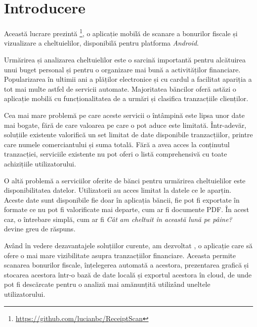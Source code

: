 \chapter{Introducere}\label{introducere}
\setcounter{page}{1}

Această lucrare prezintă \AppNameB \footnote{\href{https://github.com/lucianbc/ReceiptScan}{https://github.com/lucianbc/ReceiptScan}}, o aplicație mobilă de scanare a bonurilor fiscale și vizualizare a cheltuielilor, disponibilă pentru platforma \emph{Android}.


Urmărirea și analizarea cheltuielilor este o sarcină importantă pentru alcătuirea unui buget personal și pentru o organizare mai bună a activităților financiare. Popularizarea în ultimii ani a plăților electronice și cu cardul a facilitat apariția a tot mai multe astfel de servicii automate. Majoritatea băncilor oferă astăzi o aplicație mobilă cu funcționalitatea de a urmări și clasifica tranzacțiile clienților.

Cea mai mare problemă pe care aceste servicii o întâmpină este lipsa unor date mai bogate, fără de care valoarea pe care o pot aduce este limitată. Într-adevăr, soluțiile existente valorifică un set limitat de date disponibile tranzacțiilor, printre care numele comerciantului și suma totală. Fără a avea acces la conținutul tranzacției, serviciile existente nu pot oferi o listă comprehensivă cu toate achizițiile utilizatorului.

O altă problemă a serviciilor oferite de bănci pentru urmărirea cheltuielilor este disponibilitatea datelor. Utilizatorii au acces limitat la datele ce le aparțin. Aceste date sunt disponibile fie doar în aplicația băncii, fie pot fi exportate în formate ce nu pot fi valorificate mai departe, cum ar fi documente PDF. În acest caz, o întrebare simplă, cum ar fi \textit{Cât am cheltuit în această lună pe pâine?} devine greu de răspuns.

Având în vedere dezavantajele soluțiilor curente, am dezvoltat \AppName, o aplicație care să ofere o mai mare vizibilitate asupra tranzacțiilor financiare. Aceasta permite scanarea bonurilor fiscale, înțelegerea automată a acestora, prezentarea grafică și stocarea acestora într-o bază de date locală și exportul acestora în cloud, de unde pot fi descărcate pentru o analiză mai amănunțită utilizând uneltele utilizatorului.

